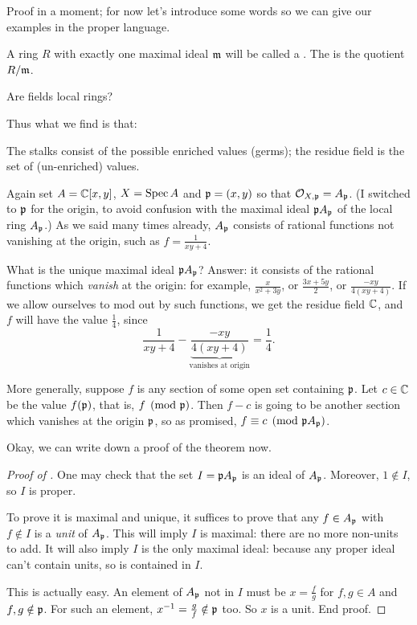 Proof in a moment;
for now let's introduce some words so we can
give our examples in the proper language.
\begin{definition}
	A ring $R$ with exactly one maximal ideal $\mathfrak m$
	will be called a .
	The  is the quotient $R / \mathfrak m$.
\end{definition}
\begin{ques}
	Are fields local rings?
\end{ques}

Thus what we find is that:
\begin{moral}
	The stalks consist of the possible enriched values (germs);
	the residue field is the set of (un-enriched) values.
\end{moral}

\begin{example}
	Again set $A = \mathbb C[x,y]$, $X = \operatorname{Spec} A$ and $\mathfrak p = (x,y)$
	so that $\mathcal O_{X,\mathfrak p} = A_\mathfrak p$.
	(I switched to $\mathfrak p$ for the origin,
	to avoid confusion with the maximal ideal $\mathfrak p A_{\mathfrak p}$
	of the local ring $A_\mathfrak p$.)
	As we said many times already,
	$A_{\mathfrak p}$ consists of rational functions not vanishing at the origin,
	such as $f = \frac{1}{xy+4}$.

	What is the unique maximal ideal $\mathfrak p A_\mathfrak p$?
	Answer: it consists of the rational functions
	which \emph{vanish} at the origin:
	for example, $\frac{x}{x^2+3y}$, or $\frac{3x+5y}{2}$,
	or $\frac{-xy}{4(xy+4)}$.
	If we allow ourselves to mod out by such functions,
	we get the residue field $\mathbb C$,
	and $f$ will have the value $\frac14$, since
	\[ \frac{1}{xy+4} -
		{\underbrace{\frac{-xy}{4(xy+4)}}_{\text{vanishes at origin}}}
		= \frac14. \]

	More generally, suppose $f$ is any section of some open
	set containing $\mathfrak p$.
	Let $c \in \mathbb C$ be the value $f(\mathfrak p)$, that is, $f \pmod {\mathfrak p}$.
	Then $f - c$ is going to be another section
	which vanishes at the origin $\mathfrak p$,
	so as promised, $f \equiv c \pmod{\mathfrak p A_{\mathfrak p}}$.
\end{example}

Okay, we can write down a proof of the theorem now.
\begin{proof}
	[Proof of ]
	One may check that the set $I = \mathfrak p A_\mathfrak p$ is an ideal of $A_\mathfrak p$.
	Moreover, $1 \notin I$, so $I$ is proper.

	To prove it is maximal and unique,
	it suffices to prove that any $f \in A_\mathfrak p$ with $f \notin I$
	is a \emph{unit} of $A_\mathfrak p$.
	This will imply $I$ is maximal: there are no more non-units to add.
	It will also imply $I$ is the only maximal ideal:
	because any proper ideal can't contain units, so is contained in $I$.

	This is actually easy.
	An element of $A_\mathfrak p$ not in $I$ must be $x = \frac fg$
	for $f,g \in A$ and $f,g \notin \mathfrak p$.
	For such an element, $x^{-1} = \frac gf \notin \mathfrak p$ too.
	So $x$ is a unit. End proof.
\end{proof}

